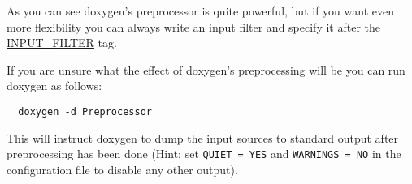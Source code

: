As you can see doxygen's preprocessor is quite powerful, but if you want even more flexibility you can always write an input filter and specify it after the \hyperlink{config_cfg_input_filter}{INPUT\_\-FILTER} tag.

If you are unsure what the effect of doxygen's preprocessing will be you can run doxygen as follows: 

\footnotesize\begin{verbatim}
  doxygen -d Preprocessor
\end{verbatim}
\normalsize
 This will instruct doxygen to dump the input sources to standard output after preprocessing has been done (Hint: set {\tt QUIET = YES} and {\tt WARNINGS = NO} in the configuration file to disable any other output).

 
